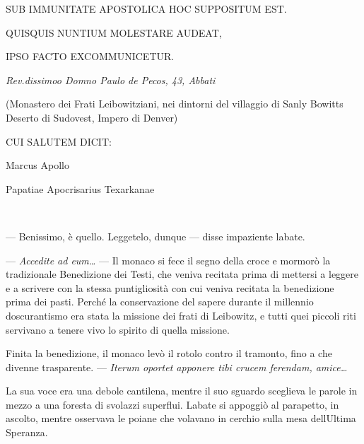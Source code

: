 \begin{center}
	{\large{SUB IMMUNITATE APOSTOLICA HOC SUPPOSITUM EST.}}
\end{center}

\begin{center}
	{\large{QUISQUIS NUNTIUM MOLESTARE AUDEAT,}}
\end{center}

\begin{center}
	{\large{IPSO FACTO EXCOMMUNICETUR.}}
\end{center}

{\begin{flushleft}
		\emph{Rev.dissimoo Domno Paulo de Pecos, 43, Abbati}
\end{flushleft}}

{\begin{flushright}
		(Monastero dei Frati Leibowitziani, nei dintorni del villaggio di Sanly
		Bowitts Deserto di Sudovest, Impero di Denver)
\end{flushright}}

{\begin{flushleft}
		CUI SALUTEM DICIT:
\end{flushleft}}

{\begin{flushright}
		Marcus Apollo
		
		Papatiae Apocrisarius Texarkanae
\end{flushright}}

~

--- Benissimo, è quello. Leggetelo, dunque --- disse impaziente
l\textquotesingle abate.

--- \emph{Accedite ad eum\ldots{}} --- Il monaco si fece il segno della
croce e mormorò la tradizionale Benedizione dei Testi, che veniva
recitata prima di mettersi a leggere e a scrivere con la stessa
puntigliosità con cui veniva recitata la benedizione prima dei pasti.
Perché la conservazione del sapere durante il millennio
d\textquotesingle oscurantismo era stata la missione dei frati di
Leibowitz, e tutti quei piccoli riti servivano a tenere vivo lo spirito
di quella missione.

Finita la benedizione, il monaco levò il rotolo contro il tramonto, fino
a che divenne trasparente. --- \emph{Iterum oportet apponere tibi crucem
	ferendam, amice\ldots{}}

La sua voce era una debole cantilena, mentre il suo sguardo sceglieva le
parole in mezzo a una foresta di svolazzi superflui.
L\textquotesingle abate si appoggiò al parapetto, in ascolto, mentre
osservava le poiane che volavano in cerchio sulla mesa
dell\textquotesingle Ultima Speranza.

